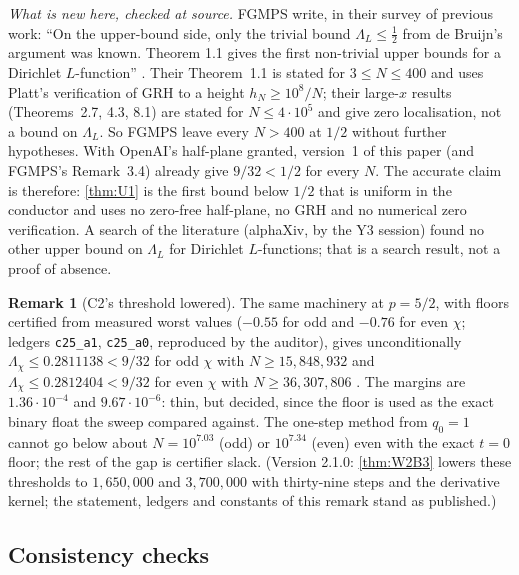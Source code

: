 \documentclass[11pt]{article}
\theoremstyle{definition}
\newtheorem{remark}[theorem]{Remark}
\newcommand{\lean}[1]{\texttt{#1}}
\newcommand{\Lc}{\Lambda}
\begin{document}
\emph{What is new here, checked at source.} FGMPS write, in their survey of previous work: ``On the upper-bound side, only the trivial bound $\Lc_L \le \tfrac12$ from de Bruijn's argument was known. Theorem 1.1 gives the first non-trivial upper bounds for a Dirichlet $L$-function'' \cite[\S1]{FGMPS2026}. Their Theorem~1.1 is stated for $3 \le N \le 400$ and uses Platt's verification of GRH to a height $h_N \ge 10^8/N$; their large-$x$ results (Theorems~2.7, 4.3, 8.1) are stated for $N \le 4\cdot10^5$ and give zero localisation, not a bound on $\Lc_L$. So FGMPS leave every $N > 400$ at $1/2$ without further hypotheses. With OpenAI's half-plane granted, version~1 of this paper (and FGMPS's Remark~3.4) already give $9/32 < 1/2$ for every $N$. The accurate claim is therefore: \cref{thm:U1} is the first bound below $1/2$ that is uniform in the conductor and uses no zero-free half-plane, no GRH and no numerical zero verification. A search of the literature (alphaXiv, by the Y3 session) found no other upper bound on $\Lc_L$ for Dirichlet $L$-functions; that is a search result, not a proof of absence.

\begin{remark}[C2's threshold lowered]\label{rem:U2}
The same machinery at $p = 5/2$, with floors certified from measured worst values ($-0.55$ for odd and $-0.76$ for even $\chi$; ledgers \lean{c25\_a1}, \lean{c25\_a0}, reproduced by the auditor), gives unconditionally $\Lc_\chi \le 0.2811138 < 9/32$ for odd $\chi$ with $N \ge 15{,}848{,}932$ and $\Lc_\chi \le 0.2812404 < 9/32$ for even $\chi$ with $N \ge 36{,}307{,}806$ \cite[Y3 memo \S3.5]{dq1records}. The margins are $1.36\cdot10^{-4}$ and $9.67\cdot10^{-6}$: thin, but decided, since the floor is used as the exact binary float the sweep compared against. The one-step method from $q_0 = 1$ cannot go below about $N = 10^{7.03}$ (odd) or $10^{7.34}$ (even) even with the exact $t = 0$ floor; the rest of the gap is certifier slack. (Version 2.1.0: \cref{thm:W2B3} lowers these thresholds to $1{,}650{,}000$ and $3{,}700{,}000$ with thirty-nine steps and the derivative kernel; the statement, ledgers and constants of this remark stand as published.)
\end{remark}

\subsection{Consistency checks}\label{sec:v2checks}
\end{document}

